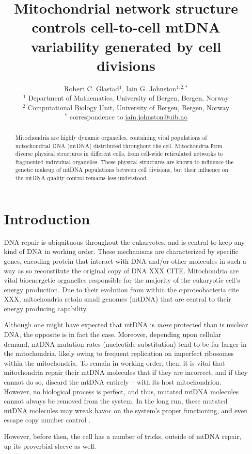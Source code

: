 \documentclass[12pt]{article}
\title{Mitochondrial network structure controls cell-to-cell mtDNA variability generated by cell divisions}
\author{Robert C. Glastad${}^1$, Iain G. Johnston${}^{1,2,*}$ \\ \footnotesize ${}^1$ Department of Mathematics, University of Bergen, Bergen, Norway \\ \footnotesize ${}^2$ Computational Biology Unit, University of Bergen, Bergen, Norway \\ \footnotesize ${}^*$ correspondence to \url{iain.johnston@uib.no}}
\date{}
\begin{document}
\maketitle
\begin{abstract}
Mitochondria are highly dynamic organelles, containing vital populations of mitochondrial DNA (mtDNA) distributed throughout the cell. Mitochondria form diverse physical structures in different cells, from cell-wide reticulated networks to fragmented individual organelles. These physical structures are known to influence the genetic makeup of mtDNA populations between cell divisions, but their influence on the mtDNA quality control remains less understood.
\end{abstract}

\section*{Introduction}
DNA repair is ubiquituous throughout the eukaryotes, and is central to keep any kind of DNA in working order. These mechanisms are characterized by specific genes, encoding protein that interact with DNA and/or other molecules in such a way as so reconstitute the original copy of DNA XXX CITE. Mitochondria are vital bioenergetic organelles responsible for the majority of the eukaryotic cell's energy production. Due to their evolution from within the $\alpha$proteobacteria cite XXX, mitochondria retain small genomes (mtDNA) that are central to their energy producing capability.

Although one might have expected that mtDNA is \textit{more} protected than is nuclear DNA, the opposite is in fact the case. Moreover, depending upon cellular demand, mtDNA mutation rates (nucleotide substitution) tend to be far larger in the mitochondria, likely owing to frequent replication on imperfect ribosomes within the mitochondria. To remain in working order, then, it is vital that mitochondria repair their mtDNA molecules that if they are incorrect, and if they cannot do so, discard the mtDNA entirely -- with its host mitochondrion. However, no biological process is perfect, and thus, mutated mtDNA molecules cannot always be removed from the system. In the long run, these mutated mtDNA molecules may wreak havoc on the system's proper functioning, and even escape copy number control \citep{pereira2021cellular}.

However, before then, the cell has a number of tricks, outside of mtDNA repair, up its proverbial sleeve as well. \citep{bereiter1996dynamics}
\end{document}
